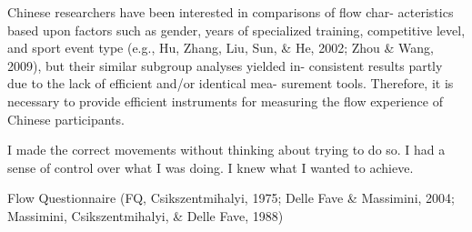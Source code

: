 Chinese researchers have been interested in comparisons of flow char-
acteristics based upon factors such as gender, years of specialized training, competitive level, and sport event type (e.g., Hu, Zhang, Liu, Sun, & He, 2002; Zhou & Wang, 2009), but their similar subgroup analyses yielded in- consistent results partly due to the lack of efficient and/or identical mea- surement tools. Therefore, it is necessary to provide efficient instruments for measuring the flow experience of Chinese participants.

I made the correct movements without thinking about trying to do so.
I had a sense of control over what I was doing.
I knew what I wanted to achieve.


  Flow Questionnaire (FQ, Csikszentmihalyi, 1975; Delle Fave & Massimini, 2004; Massimini, Csikszentmihalyi, & Delle Fave, 1988)
